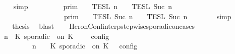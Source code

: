 \begin{isabellebody}
\ \ \ \ \ \ \isamarkupfalse%
\ simp\isanewline
\ \ \ \ \isamarkupfalse%
\ \isamarkupfalse%
\ {\isacartoucheopen}{\isasymlbrakk}{\isasymlbrakk}\ {\isasymGamma}\ {\isasymrbrakk}{\isasymrbrakk}\isactrlsub p\isactrlsub r\isactrlsub i\isactrlsub m\ {\isasyminter}\ {\isasymlbrakk}{\isasymlbrakk}\ {\isacharbrackleft}{\isacharbrackright}\ {\isasymrbrakk}{\isasymrbrakk}\isactrlsub T\isactrlsub E\isactrlsub S\isactrlsub L\isactrlbsup {\isasymge}\ n\isactrlesup \ {\isasyminter}\ {\isasymlbrakk}{\isasymlbrakk}\ {\isasymPhi}\ {\isasymrbrakk}{\isasymrbrakk}\isactrlsub T\isactrlsub E\isactrlsub S\isactrlsub L\isactrlbsup {\isasymge}\ Suc\ n\isactrlesup \isanewline
\ \ \ \ \ \ \ \ \ \ \ \ \ \ \ \ \ \ \ {\isacharequal}\ {\isasymlbrakk}{\isasymlbrakk}\ {\isasymGamma}\ {\isasymrbrakk}{\isasymrbrakk}\isactrlsub p\isactrlsub r\isactrlsub i\isactrlsub m\ {\isasyminter}\ {\isasymlbrakk}{\isasymlbrakk}\ {\isasymPhi}\ {\isasymrbrakk}{\isasymrbrakk}\isactrlsub T\isactrlsub E\isactrlsub S\isactrlsub L\isactrlbsup {\isasymge}\ Suc\ n\isactrlesup \ {\isasyminter}\ {\isasymlbrakk}{\isasymlbrakk}\ {\isacharbrackleft}{\isacharbrackright}\ {\isasymrbrakk}{\isasymrbrakk}\isactrlsub T\isactrlsub E\isactrlsub S\isactrlsub L\isactrlbsup {\isasymge}\ Suc\ n\isactrlesup {\isacartoucheclose}\isanewline
\ \ \ \ \ \ \isamarkupfalse%
\ simp\isanewline
\ \ \ \ \isamarkupfalse%
\ \isamarkupfalse%
\ {\isacharquery}thesis\ \isamarkupfalse%
\ blast\isanewline
\ \ \isamarkupfalse%
%
\endisatagproof
{\isafoldproof}%
%
\isadelimproof
\isanewline
%
\endisadelimproof
\isanewline
{}\isamarkupfalse%
\ HeronConf{\isacharunderscore}interp{\isacharunderscore}stepwise{\isacharunderscore}sporadicon{\isacharunderscore}cases{\isacharcolon}\isanewline
\ \ \ {\isacartoucheopen}{\isasymlbrakk}\ {\isasymGamma}{\isacharcomma}\ n\ {\isasymturnstile}\ {\isacharparenleft}{\isacharparenleft}K\ sporadic\ {\isasymtau}\ on\ K\ {\isacharhash}\ {\isasymPsi}{\isacharparenright}\ {\isasymtriangleright}\ {\isasymPhi}\ {\isasymrbrakk}\isactrlsub c\isactrlsub o\isactrlsub n\isactrlsub f\isactrlsub i\isactrlsub g\isanewline
\ \ \ \ \ \ \ \ \ \ {\isacharequal}\ {\isasymlbrakk}\ {\isasymGamma}{\isacharcomma}\ n\ {\isasymturnstile}\ {\isasymPsi}\ {\isasymtriangleright}\ {\isacharparenleft}{\isacharparenleft}K\ sporadic\ {\isasymtau}\ on\ K\ {\isacharhash}\ {\isasymPhi}{\isacharparenright}\ {\isasymrbrakk}\isactrlsub c\isactrlsub o\isactrlsub n\isactrlsub f\isactrlsub i\isactrlsub g\isanewline

\end{isabellebody}
